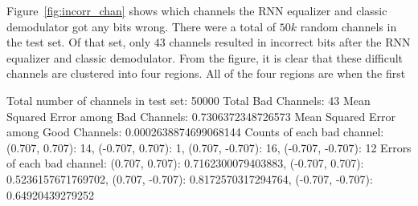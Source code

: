 Figure~\ref{fig:incorr_chan} shows which channels the RNN equalizer and classic demodulator got any bits wrong.  
There were a total of $50k$ random channels in the test set.  
Of that set, only $43$ channels resulted in incorrect bits after the RNN equalizer and classic demodulator.
From the figure, it is clear that these difficult channels are clustered into four regions. All of the four regions are when the first 


Total number of channels in test set: 50000
Total Bad Channels: 43
Mean Squared Error among Bad Channels: 0.7306372348726573
Mean Squared Error among Good Channels: 0.0002638874699068144
Counts of each bad channel: {(0.707, 0.707): 14, (-0.707, 0.707): 1, (0.707, -0.707): 16, (-0.707, -0.707): 12}
Errors of each bad channel: {(0.707, 0.707): 0.7162300079403883, (-0.707, 0.707): 0.5236157671769702, (0.707, -0.707): 0.8172570317294764, (-0.707, -0.707): 0.64920439279252}

